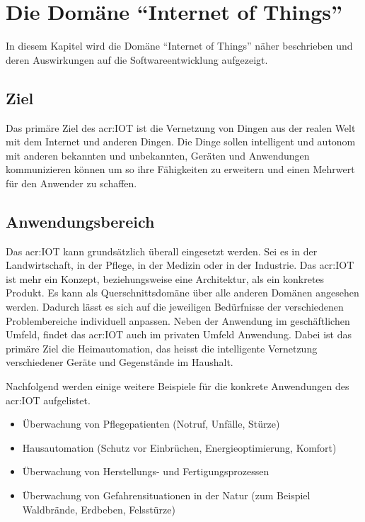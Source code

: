 \chapter{Die Domäne "`Internet of Things"'} \label{chap:DomainIot}
In diesem Kapitel wird die Domäne "`Internet of Things"' näher beschrieben und deren Auswirkungen auf die Softwareentwicklung aufgezeigt.



\section{Ziel}
Das primäre Ziel des \gls{acr:IOT} ist die Vernetzung von Dingen aus der realen Welt mit dem Internet und anderen Dingen. Die Dinge sollen intelligent und autonom mit anderen bekannten und unbekannten, Geräten und Anwendungen kommunizieren können um so ihre Fähigkeiten zu erweitern und einen Mehrwert für den Anwender zu schaffen. 



\section{Anwendungsbereich}
Das \gls{acr:IOT} kann grundsätzlich überall eingesetzt werden. Sei es in der Landwirtschaft, in der Pflege, in der Medizin oder in der Industrie. Das \gls{acr:IOT} ist mehr ein Konzept, beziehungsweise eine Architektur, als ein konkretes Produkt. Es kann als Querschnittsdomäne über alle anderen Domänen angesehen werden. Dadurch lässt es sich auf die jeweiligen Bedürfnisse der verschiedenen Problembereiche individuell anpassen. Neben der Anwendung im geschäftlichen Umfeld, findet das \gls{acr:IOT} auch im privaten Umfeld Anwendung. Dabei ist das primäre Ziel die Heimautomation, das heisst die intelligente Vernetzung verschiedener Geräte und Gegenstände im Haushalt.

Nachfolgend werden einige weitere Beispiele für die konkrete Anwendungen des \gls{acr:IOT} aufgelistet.


\begin{itemize}
\item Überwachung von Pflegepatienten (Notruf, Unfälle, Stürze)
\item Hausautomation (Schutz vor Einbrüchen, Energieoptimierung, Komfort)
\item Überwachung von Herstellungs- und Fertigungsprozessen
\item Überwachung von Gefahrensituationen in der Natur (zum Beispiel Waldbrände, Erdbeben, Felsstürze)
\end{itemize}

